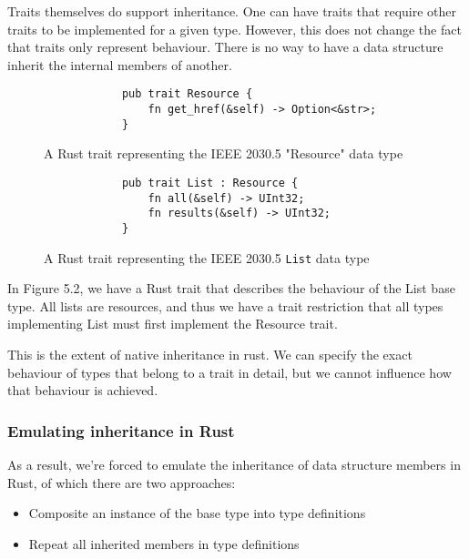 Traits themselves do support inheritance. One can have traits that require other traits to be implemented for a given type. However, this does not change the fact that traits only represent behaviour. 
There is no way to have a data structure inherit the internal members of another.

\begin{figure}[H]
    \begin{center}
        \begin{lstlisting}
            pub trait Resource {
                fn get_href(&self) -> Option<&str>;
            }
        \end{lstlisting}
        \caption{A Rust trait representing the IEEE 2030.5 "Resource" data type}
    \end{center}
\end{figure}



\begin{figure}[H]
    \begin{center}
        \begin{lstlisting}
            pub trait List : Resource {
                fn all(&self) -> UInt32;
                fn results(&self) -> UInt32;
            }
        \end{lstlisting}
        \caption{A Rust trait representing the IEEE 2030.5 \texttt{List} data type}
    \end{center}
\end{figure}

In Figure 5.2, we have a Rust trait that describes the behaviour of the List base type. All lists are resources, and thus we have a trait restriction that all types implementing List must first implement the Resource trait.

This is the extent of native inheritance in rust. We can specify the exact behaviour of types that belong to a trait in detail, but we cannot influence how that behaviour is achieved.

\subsubsection{Emulating inheritance in Rust}

As a result, we're forced to emulate the inheritance of data structure members in Rust, of which there are two approaches:

\begin{itemize}
    \item Composite an instance of the base type into type definitions 
    \item Repeat all inherited members in type definitions
\end{itemize}

